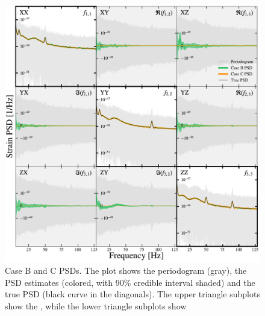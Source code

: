 \documentclass[%
 reprint,
 amsmath,amssymb,
 aps,
 nofootinbib,
]{revtex4-2}
\begin{document}
\begin{figure}
\centering
\includegraphics[width=\textwidth]{caseBC_psd.pdf}
\caption{Case B and C PSDs. The plot shows the periodogram (gray), the PSD estimates (colored, with 90\% credible interval shaded) and the true PSD (black curve in the diagonals). The upper triangle subplots show the , while the lower triangle subplots show }
\label{fig:caseBC_psd}
\end{figure}


\end{document}
